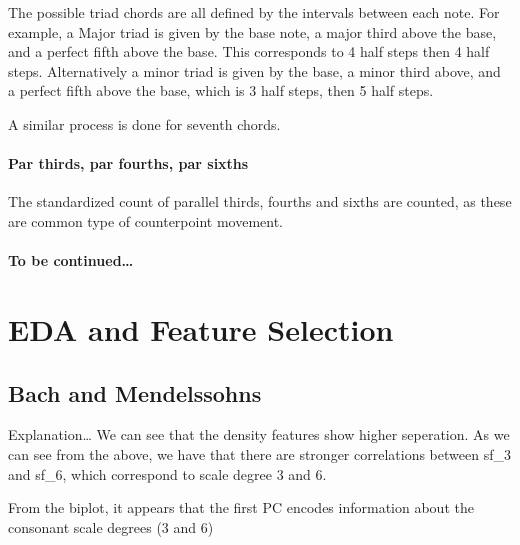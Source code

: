\documentclass[12pt,twoside]{reedthesis}
\theoremstyle{definition}
\theoremstyle{definition}
\theoremstyle{definition}
\theoremstyle{remark}
\begin{document}
The possible triad chords are all defined by the intervals between each
note. For example, a Major triad is given by the base note, a major
third above the base, and a perfect fifth above the base. This
corresponds to 4 half steps then 4 half steps. Alternatively a minor
triad is given by the base, a minor third above, and a perfect fifth
above the base, which is 3 half steps, then 5 half steps.

A similar process is done for seventh chords.

\subsubsection{Par thirds, par fourths, par
sixths}\label{par-thirds-par-fourths-par-sixths}

The standardized count of parallel thirds, fourths and sixths are
counted, as these are common type of counterpoint movement.

\subsubsection{To be continued\ldots{}}\label{to-be-continued}

\chapter{EDA and Feature Selection}\label{eda-and-feature-selection}

\section{Bach and Mendelssohns}\label{bach-and-mendelssohns}

Explanation\ldots{} We can see that the density features show higher
seperation. As we can see from the above, we have that there are
stronger correlations between sf\_3 and sf\_6, which correspond to scale
degree 3 and 6.
\begin{Shaded}
\begin{Highlighting}[]

\StringTok{ }\NormalTok{(features[,}\OperatorTok{-}\NormalTok{], }
 \NormalTok{)}

\StringTok{ }\NormalTok{(} \OperatorTok{:}\NormalTok{,}
                \OperatorTok{$}\OperatorTok{^} \OperatorTok{/}\StringTok{ }\OperatorTok{$}\OperatorTok{^}\NormalTok{))}
\NormalTok{(}\OperatorTok{+}
\StringTok{  }\NormalTok{() }\OperatorTok{+}\StringTok{ }
\StringTok{  }\NormalTok{()}
\end{Highlighting}
\end{Shaded}
From the biplot, it appears that the first PC encodes information about
the consonant scale degrees (3 and 6)
\end{document}
